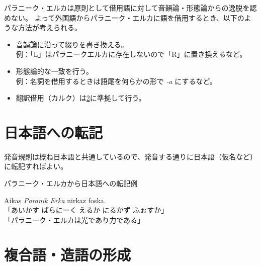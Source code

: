 パラニーク・エルカは原則として借用語に対して音韻論・形態論からの逸脱を認めない。
よって外国語からパラニーク・エルカに語を借用するとき、以下のような方法が考えられる。

\begin{itemize}
    \item 音韻論に沿って綴りを書き換える。\\
        例：「L」はパラニークエルカに存在しないので「R」に置き換えるなど。
    \item 形態論的な一致を行う。 \\
        例：名詞を借用するときは語尾を何らかの形で \emph{-a} にするなど。
    \item 翻訳借用（カルク）は\cref{section:generating-compound}に準拠して行う。
\end{itemize}

\section{日本語への転記}

発音規則は概ね日本語と共通しているので、発音する通りに日本語（仮名など）に転記すればよい。

\begin{itembox}[l]{パラニーク・エルカから日本語への転記例}
    \begin{pindent}
        \noindent
        Aikas \emph{Paranik Erka} nirkaz foska. \\
        「あいかす ぱらにーく えるか にるかず ふぉすか」 \\
        「パラニーク・エルカは光であり力である」
    \end{pindent}
\end{itembox}

\section{複合語・造語の形成}
\label{section:generating-compound}
